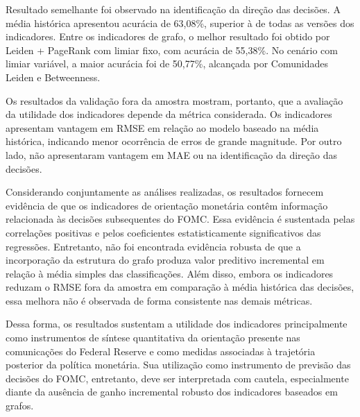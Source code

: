 Resultado semelhante foi observado na identificação da direção das decisões. A
média histórica apresentou acurácia de 63,08\%, superior à de todas as versões
dos indicadores. Entre os indicadores de grafo, o melhor resultado foi obtido
por Leiden + PageRank com limiar fixo, com acurácia de 55,38\%. No cenário com
limiar variável, a maior acurácia foi de 50,77\%, alcançada por Comunidades Leiden
e Betweenness.

Os resultados da validação fora da amostra mostram, portanto, que a avaliação da
utilidade dos indicadores depende da métrica considerada. Os indicadores apresentam
vantagem em RMSE em relação ao modelo baseado na média histórica, indicando menor
ocorrência de erros de grande magnitude. Por outro lado, não apresentaram vantagem
em MAE ou na identificação da direção das decisões.

Considerando conjuntamente as análises realizadas, os resultados fornecem evidência
de que os indicadores de orientação monetária contêm informação relacionada às
decisões subsequentes do FOMC. Essa evidência é sustentada pelas correlações
positivas e pelos coeficientes estatisticamente significativos das regressões.
Entretanto, não foi encontrada evidência robusta de que a incorporação da estrutura
do grafo produza valor preditivo incremental em relação à média simples das
classificações. Além disso, embora os indicadores reduzam o RMSE fora da amostra
em comparação à média histórica das decisões, essa melhora não é observada de
forma consistente nas demais métricas.

Dessa forma, os resultados sustentam a utilidade dos indicadores principalmente
como instrumentos de síntese quantitativa da orientação presente nas comunicações
do Federal Reserve e como medidas associadas à trajetória posterior da política
monetária. Sua utilização como instrumento de previsão das decisões do FOMC,
entretanto, deve ser interpretada com cautela, especialmente diante da ausência
de ganho incremental robusto dos indicadores baseados em grafos.